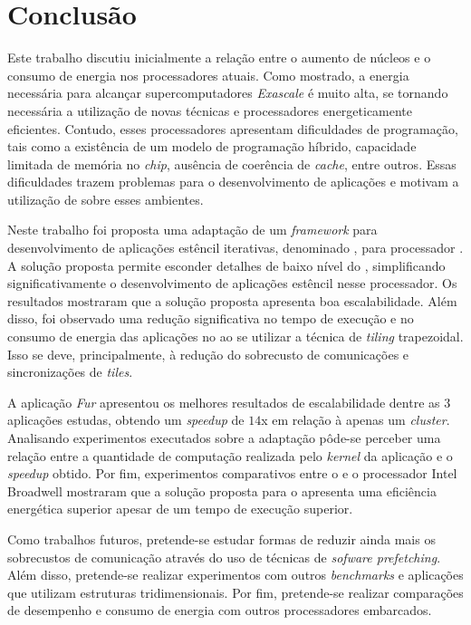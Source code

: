 \chapter{Conclusão}
\label{cha:conclusao}
Este trabalho discutiu inicialmente a relação entre o aumento de núcleos e o consumo de
energia nos processadores atuais. Como mostrado, a energia necessária para alcançar supercomputadores
\textit{Exascale} é muito alta, se tornando necessária a utilização de
novas técnicas e processadores energeticamente eficientes. Contudo, esses
processadores apresentam dificuldades de programação, tais como a existência de
um modelo de programação híbrido, capacidade limitada de memória no
\textit{chip}, ausência de coerência de \textit{cache}, entre outros. Essas
dificuldades trazem problemas para o desenvolvimento
de aplicações e motivam a utilização de \fws sobre esses ambientes.


Neste trabalho foi proposta uma adaptação de um \textit{framework} para
desenvolvimento de aplicações estêncil iterativas, denominado \pskel, para
processador \mppa. A solução proposta permite esconder detalhes de baixo nível
do \mppa, simplificando significativamente o desenvolvimento de aplicações
estêncil nesse processador. Os resultados mostraram que a solução proposta
apresenta boa escalabilidade. Além disso, foi observado uma redução
significativa no tempo de execução e no consumo de energia das aplicações no
\mppa ao se utilizar a técnica de \textit{tiling} trapezoidal. Isso se deve,
principalmente, à redução do sobrecusto de comunicações e sincronizações de
\textit{tiles}.

A aplicação \textit{Fur} apresentou os melhores resultados de escalabilidade
dentre as 3 aplicações estudas, obtendo um \textit{speedup} de $14$x em relação
à apenas um \textit{cluster}. Analisando experimentos executados sobre a
adaptação pôde-se perceber uma relação entre a quantidade de computação
realizada pelo \textit{kernel} da aplicação e o \textit{speedup} obtido. Por
fim, experimentos comparativos entre o \mppa e o processador Intel Broadwell
mostraram que a solução proposta para o \mppa apresenta uma eficiência
energética superior apesar de um tempo de execução superior.

Como trabalhos futuros, pretende-se estudar formas de reduzir ainda mais os
sobrecustos de comunicação através do uso de técnicas de \textit{sofware
    prefetching}. Além disso, pretende-se realizar experimentos com outros
\textit{benchmarks} e aplicações que utilizam estruturas tridimensionais. Por
fim, pretende-se realizar comparações de desempenho e consumo de energia com
outros processadores embarcados.
